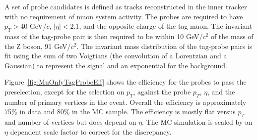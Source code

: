 A set of probe candidates is defined as tracks reconstructed in the inner tracker with no requirement
of muon system activity. The probes are required to have $p_T > 40$ GeV/$c$, $|\eta| < 2.1$, and the opposite charge of the tag muon.
The invariant mass of the tag-probe pair is then required to be within 10 GeV/$c^2$ of the mass of the Z boson, 91 GeV/$c^2$.
The invariant mass distribution of the tag-probe pairs is fit using the
sum of two Voigtians (the convolution of a Lorentzian and a Gaussian) to represent the signal and an exponential for the background.

Figure~\ref{fig:MuOnlyTagProbeEff} shows the efficiency for the probes
to pass the preselection, except for the selection on $p_T$, against the probe
$p_T$, $\eta$, and the number of primary vertices in the event.
Overall the efficiency is approximately 75\% in data and 80\% in the MC sample.
The efficiency is mostly flat versus $p_T$ and number of vertices but does depend
on $\eta$.  The MC simulation is scaled by an $\eta$ dependent scale factor to correct for the discrepancy.

